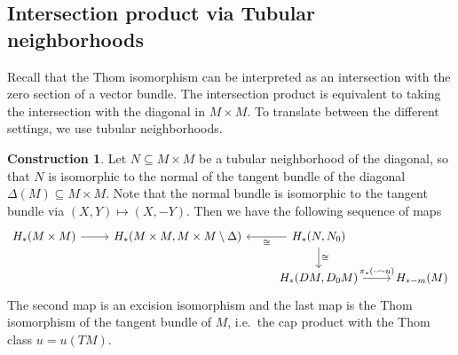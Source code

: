\documentclass{scrartcl}
\theoremstyle{plain}
\theoremstyle{definition}
\newtheorem{construction}[theorem]{Construction}
\renewcommand{\subset}{\subseteq}
\newcommand{\capp}{\mathbin{\frown}}
\newcommand{\iso}{\cong}
\begin{document}
\subsection{Intersection product via Tubular neighborhoods} \label{subsubsec:intersection_via_tubular_neighborhoods}
Recall that the Thom isomorphism can be interpreted as an intersection with the zero section of a vector bundle. The intersection product is equivalent to taking the intersection with the diagonal in $M\times M$. To translate between the different settings, we use tubular neighborhoods. 

\begin{construction}
Let $N\subset M\times M$ be a tubular neighborhood of the diagonal, so that $N$ is isomorphic to the normal of the tangent bundle of the diagonal $\Delta(M)\subset M\times M$. Note that the normal bundle is isomorphic to the tangent bundle via $(X, Y)\mapsto (X, -Y)$. Then we have the following sequence of maps
\begin{equation}
\begin{tikzcd}
    H_*(M\times M) \rar & H_*(M\times M, M\times M\setminus \Delta) & \lar["\iso"] H_*(N, N_0) \dar["\iso"] &\ \\
    & & H_*(DM, D_0M) \rar["\pi_*(\cdot \capp u)"] & H_{*-m}(M)
\end{tikzcd}
\end{equation}
The second map is an excision isomorphism and the last map is the Thom isomorphism of the tangent bundle of $M$, i.e.\ the cap product with the Thom class $u=u(TM)$. 
\end{construction}
\end{document}
